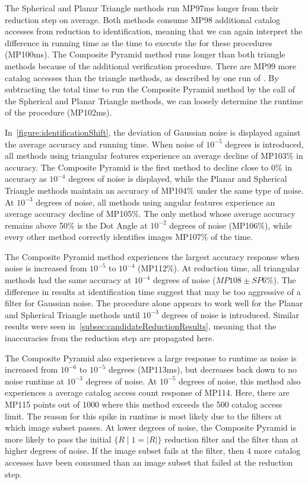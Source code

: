 The Spherical and Planar Triangle methods run MP97ms longer from their reduction step on average.
Both methods consume MP98 additional catalog accesses from reduction to identification, meaning that we can again
interpret the difference in running time as the time to execute the  for these procedures (MP100ms).
The Composite Pyramid method runs longer than both triangle methods because of the additional verification
procedure.
There are MP99 more catalog accesses than the triangle methods, as described by one run of .
By subtracting the total time to run the Composite Pyramid method by the  call of the Spherical and
Planar Triangle methods, we can loosely determine the runtime of the  procedure (MP102ms).

In~\autoref{figure:identificationShift}, the deviation of Gaussian noise is displayed against the average accuracy and
running time.
When noise of $10^{-5}$ degrees is introduced, all methods using triangular features experience an average decline of
MP103\% in accuracy.
The Composite Pyramid is the first method to decline close to 0\% in accuracy as $10^{-4}$ degrees of noise is
displayed, while the Planar and Spherical Triangle methods maintain an accuracy of MP104\% under the same type of noise.
At $10^{-3}$ degrees of noise, all methods using angular features experience an average accuracy decline of MP105\%.
The only method whose average accuracy remains above 50\% is the Dot Angle at $10^{-2}$ degrees of noise (MP106\%),
while every other method correctly identifies images MP107\% of the time.

The Composite Pyramid method experiences the largest accuracy response when noise is increased from $10^{-5}$ to
$10^{-4}$ (MP112\%).
At reduction time, all triangular methods had the same accuracy at $10^{-4}$ degrees of noise ($MP108 \pm SP6\%$).
The difference in results at identification time suggest that  may be too aggressive of a filter for
Gaussian noise.
The  procedure alone appears to work well for the Planar and Spherical Triangle methods until $10^{-3}$
degrees of noise is introduced.
Similar results were seen in~\autoref{subsec:candidateReductionResults}, meaning that the inaccuracies from the
reduction step are propagated here.

The Composite Pyramid also experiences a large response to runtime as noise is increased from $10^{-6}$ to $10^{-5}$
degrees (MP113ms), but decreases back down to no noise runtime at $10^{-3}$ degrees of noise.
At $10^{-5}$ degrees of noise, this method also experiences a average catalog access count response of MP114.
Here, there are MP115 points out of 1000 where this method exceeds the 500 catalog access limit.
The reason for this spike in runtime is most likely due to the filters at which image subset passes.
At lower degrees of noise, the Composite Pyramid is more likely to pass the initial $\{ R \mid 1 = |R| \}$ reduction filter
and the  filter than at higher degrees of noise.
If the image subset fails at the  filter, then 4 more catalog accesses have been consumed than an image
subset that failed at the reduction step.

